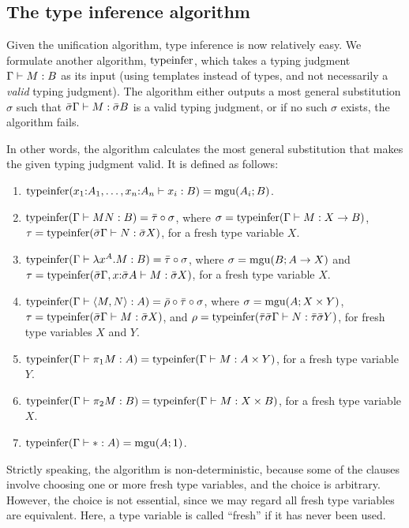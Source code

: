 \documentclass{article}
\begin{document}
\subsection{The type inference algorithm}

Given the unification algorithm, type inference is now relatively
easy. We formulate another algorithm, $\mathop{\rm typeinfer}$, which takes a
typing judgment $\Gamma\vdash M:B$ as its input (using templates instead
of types, and not necessarily a {\em valid} typing judgment). The
algorithm either outputs a most general substitution $\sigma$ such
that $\bar{\sigma}\Gamma\vdash M:\bar{\sigma} B$ is a valid typing judgment, or
if no such $\sigma$ exists, the algorithm fails.

In other words, the algorithm calculates the most general substitution
that makes the given typing judgment valid. It is defined as follows:

\begin{enumerate}
\item $\mathop{\rm typeinfer}(x_1{:}A_1,\ldots,x_n{:}A_n\vdash x_i:B) =
  \mathop{\rm mgu}(A_i;B)$.
\item $\mathop{\rm typeinfer}(\Gamma\vdash MN:B)= \bar{\tau}\circ\sigma$, where
  $\sigma=\mathop{\rm typeinfer}(\Gamma\vdash M:X\to B)$,
  $\tau=\mathop{\rm typeinfer}(\bar{\sigma}\Gamma\vdash N:\bar{\sigma} X)$, for a fresh
  type variable $X$.
\item $\mathop{\rm typeinfer}(\Gamma\vdash\lambda x^{A}.M:B)=\bar{\tau}\circ\sigma$, where
  $\sigma=\mathop{\rm mgu}(B;A\to X)$ and
  $\tau=\mathop{\rm typeinfer}(\bar{\sigma}\Gamma,x{:}\bar{\sigma} A\vdash M:\bar{\sigma}
  X)$, for a fresh type variable $X$.
\item $\mathop{\rm typeinfer}(\Gamma\vdash\langle M,N\rangle:A) =
  \bar{\rho}\circ\bar{\tau}\circ\sigma$, where $\sigma=\mathop{\rm mgu}(A;X\times Y)$,
  $\tau=\mathop{\rm typeinfer}(\bar{\sigma}\Gamma\vdash M:\bar{\sigma} X)$, and
  $\rho=\mathop{\rm typeinfer}(\bar{\tau}\bar{\sigma}\Gamma\vdash N:\bar{\tau}\bar{\sigma} Y)$,
  for fresh type variables $X$ and $Y$.
\item $\mathop{\rm typeinfer}(\Gamma\vdash\pi_1 M:A) = \mathop{\rm typeinfer}(\Gamma\vdash
  M:A\times Y)$, for a fresh type variable $Y$.
\item $\mathop{\rm typeinfer}(\Gamma\vdash\pi_2 M:B) = \mathop{\rm typeinfer}(\Gamma\vdash
  M:X\times B)$, for a fresh type variable $X$.
\item $\mathop{\rm typeinfer}(\Gamma\vdash{*}:A) = \mathop{\rm mgu}(A;1)$.
\end{enumerate}

Strictly speaking, the algorithm is non-deterministic, because some of
the clauses involve choosing one or more fresh type variables, and the
choice is arbitrary. However, the choice is not essential, since we
may regard all fresh type variables are equivalent. Here, a type
variable is called ``fresh'' if it has never been used.
\end{document}
